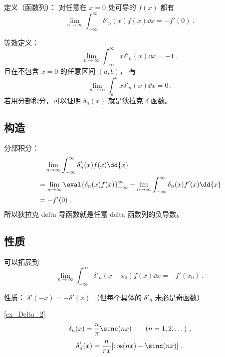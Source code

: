
\begin{issues}
\issueDraft
\end{issues}


定义（函数列）： 对任意在 $x=0$ 处可导的 $f(x)$ 都有
\begin{equation}
\lim_{n\to\infty}\int_{-\infty}^\infty \delta'_n(x) f(x) \dd{x} = -f'(0)~.
\end{equation}

等效定义：
\begin{equation}
\lim_{n\to\infty}\int_{-\infty}^\infty x\delta'_n(x) \dd{x} = -1~.
\end{equation}
且在不包含 $x=0$ 的任意区间 $(a,b)$， 有
\begin{equation}
\lim_{n\to\infty}\int_a^b x\delta'_n(x) \dd{x} = 0~.
\end{equation}
若用分部积分，可以证明 $\delta_n(x)$ 就是狄拉克 $\delta$ 函数。

\subsection{构造}
分部积分：
\begin{equation}
\begin{aligned}
&\quad \lim_{n\to\infty}\int_{-\infty}^\infty \delta'_n(x) f(x) \dd{x}\\
&= \lim_{n\to\infty}\eval{\delta_n(x) f(x)}_{-\infty}^\infty - \lim_{n\to\infty}\int_{-\infty}^\infty \delta_n(x) f'(x) \dd{x}\\
&= - f'(0)~.
\end{aligned}
\end{equation}
所以狄拉克 delta 导函数就是任意 delta 函数列的负导数。


\subsection{性质}
可以拓展到
\begin{equation}
\lim_{n\to\infty}\int_{-\infty}^\infty \delta'_n(x-x_0) f(x) \dd{x} = -f'(x_0)~.
\end{equation}

性质： $\delta'(-x) = -\delta'(x)$ （但每个具体的 $\delta'_n$ 未必是奇函数）

\begin{example}{}
\autoref{ex_Delta_2} 
\begin{equation}
\delta_n(x) = \frac{n}{\pi}\sinc(n x) \qquad (n = 1, 2, \dots)~,
\end{equation}
\begin{equation}
\delta'_n(x) = \frac{n}{\pi x} [\cos(nx)-\sinc(nx)]~.
\end{equation}
\end{example}
